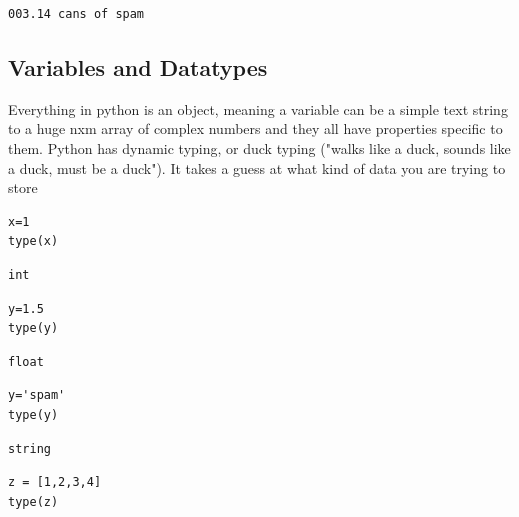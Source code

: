 \documentclass[%
oneside,                 %
final,                   %
10pt]{article}
\begin{document}
\begin{Verbatim}[numbers=none,fontsize=\fontsize{9pt}{9pt},baselinestretch=0.95,xleftmargin=2mm]
003.14 cans of spam
\end{Verbatim}


\subsection{Variables and Datatypes}

 Everything in python is an object, meaning a variable can be a simple text string to a huge nxm array of complex numbers and they all have properties specific to them.
 Python has dynamic typing, or duck typing ("walks like a duck, sounds like a duck, must be a duck"). It takes a guess at what kind of data you are trying to store

\begin{Verbatim}[numbers=none,fontsize=\fontsize{9pt}{9pt},baselinestretch=0.95,xleftmargin=2mm]
x=1
type(x)
\end{Verbatim}

\begin{Verbatim}[numbers=none,fontsize=\fontsize{9pt}{9pt},baselinestretch=0.95,xleftmargin=2mm]
int
\end{Verbatim}


\begin{Verbatim}[numbers=none,fontsize=\fontsize{9pt}{9pt},baselinestretch=0.95,xleftmargin=2mm]
y=1.5
type(y)
\end{Verbatim}

\begin{Verbatim}[numbers=none,fontsize=\fontsize{9pt}{9pt},baselinestretch=0.95,xleftmargin=2mm]
float
\end{Verbatim}


\begin{Verbatim}[numbers=none,fontsize=\fontsize{9pt}{9pt},baselinestretch=0.95,xleftmargin=2mm]
y='spam'
type(y)
\end{Verbatim}

\begin{Verbatim}[numbers=none,fontsize=\fontsize{9pt}{9pt},baselinestretch=0.95,xleftmargin=2mm]
string
\end{Verbatim}


\begin{Verbatim}[numbers=none,fontsize=\fontsize{9pt}{9pt},baselinestretch=0.95,xleftmargin=2mm]
z = [1,2,3,4]
type(z)
\end{Verbatim}
\end{document}
